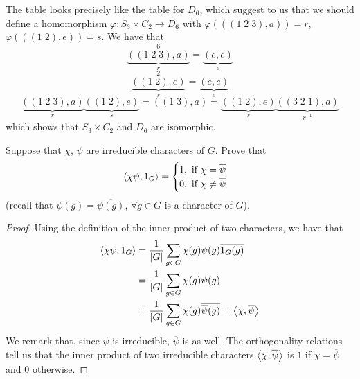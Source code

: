 \begin{solution}
The table looks precisely like the table for \(D_6\), which suggest to us that we should define a homomorphism \(\varphi \colon S_3 \times C_2 \to D_6\) with \(\varphi(((1 \; 2 \; 3), a)) = r\), \(\varphi(((1 \; 2), e)) = s\). We have that
\[
    \underbrace{((1 \; 2 \; 3), a)}_{r}^6 = \underbrace{(e, e)}_{e}
\]
\[
    \underbrace{((1 \; 2), e)}_{s}^2 = \underbrace{(e, e)}_{e}
\]
\[
    \underbrace{((1 \; 2 \; 3), a)}_{r} \underbrace{((1 \; 2), e)}_{s} = ((1 \; 3), a) = \underbrace{((1 \; 2), e)}_{s} \underbrace{((3 \; 2 \; 1), a)}_{r^{-1}}
\]
which shows that \(S_3 \times C_2\) and \(D_6\) are isomorphic.
\end{solution}

\begin{exercise}
Suppose that \(\chi\), \(\psi\) are irreducible characters of \(G\). Prove that
\[
    \left\langle\chi\psi, 1_G\right\rangle =
    \begin{cases}
        1, \text{ if } \chi = \overline{\psi} \\
        0, \text{ if } \chi \neq \overline{\psi}
    \end{cases}
\]
(recall that \(\overline{\psi} (g) = \overline{\psi(g)}\), \(\forall g \in G\) is a character of \(G\)).
\end{exercise}
\begin{proof}
Using the definition of the inner product of two characters, we have that
\begin{align*}
    \left\langle\chi\psi, 1_G\right\rangle &= \frac{1}{\left|G\right|} \sum_{g \in G} \chi(g)\psi(g)\overline{1_{G}(g)} \\
    &= \frac{1}{\left|G\right|} \sum_{g \in G} \chi(g)\psi(g) \\
    &= \frac{1}{\left|G\right|} \sum_{g \in G} \chi(g)\overline{\overline{\psi}(g)} = \left\langle\chi, \overline{\psi}\right\rangle
\end{align*}
We remark that, since \(\psi\) is irreducible, \(\overline{\psi}\) is as well. The orthogonality relations tell us that the inner product of two irreducible characters \(\left\langle\chi, \overline{\psi}\right\rangle\) is \(1\) if \(\chi = \overline{\psi}\) and \(0\) otherwise.
\end{proof}

